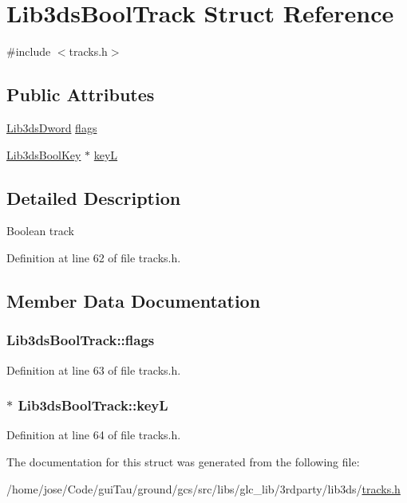 \hypertarget{struct_lib3ds_bool_track}{\section{Lib3ds\-Bool\-Track Struct Reference}
\label{struct_lib3ds_bool_track}
}


{\ttfamily \#include $<$tracks.\-h$>$}

\subsection*{Public Attributes}
\begin{DoxyCompactItemize}
\item 
\hyperlink{types_8h_a299c9663303144c562f6bd92c2f273d3}{Lib3ds\-Dword} \hyperlink{struct_lib3ds_bool_track_ab6a3064cc073ec23009c7ac9d4685af1}{flags}
\item 
\hyperlink{struct_lib3ds_bool_key}{Lib3ds\-Bool\-Key} $\ast$ \hyperlink{struct_lib3ds_bool_track_acf18bdd743c3fa37e05a85af6aef5813}{key\-L}
\end{DoxyCompactItemize}


\subsection{Detailed Description}
Boolean track 

Definition at line 62 of file tracks.\-h.



\subsection{Member Data Documentation}
\hypertarget{struct_lib3ds_bool_track_ab6a3064cc073ec23009c7ac9d4685af1}{
\subsubsection[{flags}]{ Lib3ds\-Bool\-Track\-::flags}}\label{struct_lib3ds_bool_track_ab6a3064cc073ec23009c7ac9d4685af1}


Definition at line 63 of file tracks.\-h.

\hypertarget{struct_lib3ds_bool_track_acf18bdd743c3fa37e05a85af6aef5813}{
\subsubsection[{key\-L}]{$\ast$ Lib3ds\-Bool\-Track\-::key\-L}}\label{struct_lib3ds_bool_track_acf18bdd743c3fa37e05a85af6aef5813}


Definition at line 64 of file tracks.\-h.



The documentation for this struct was generated from the following file\-:\begin{DoxyCompactItemize}
\item 
/home/jose/\-Code/gui\-Tau/ground/gcs/src/libs/glc\-\_\-lib/3rdparty/lib3ds/\hyperlink{tracks_8h}{tracks.\-h}\end{DoxyCompactItemize}
